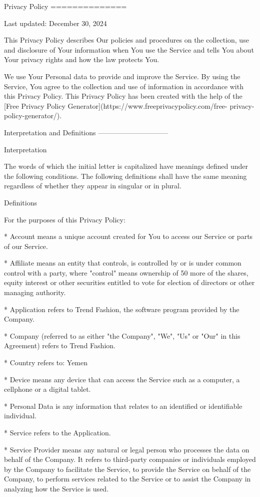 Privacy Policy  
==============

Last updated: December 30, 2024

This Privacy Policy describes Our policies and procedures on the collection,
use and disclosure of Your information when You use the Service and tells You
about Your privacy rights and how the law protects You.

We use Your Personal data to provide and improve the Service. By using the
Service, You agree to the collection and use of information in accordance with
this Privacy Policy. This Privacy Policy has been created with the help of the
[Free Privacy Policy Generator](https://www.freeprivacypolicy.com/free-
privacy-policy-generator/).

Interpretation and Definitions  
------------------------------

Interpretation  
~~~~~~~~~~~~~~

The words of which the initial letter is capitalized have meanings defined
under the following conditions. The following definitions shall have the same
meaning regardless of whether they appear in singular or in plural.

Definitions  
~~~~~~~~~~~

For the purposes of this Privacy Policy:

  * Account means a unique account created for You to access our Service or
    parts of our Service.

  * Affiliate means an entity that controls, is controlled by or is under
    common control with a party, where "control" means ownership of 50%
    more of the shares, equity interest or other securities entitled to vote
    for election of directors or other managing authority.

  * Application refers to Trend Fashion, the software program provided by the
    Company.

  * Company (referred to as either "the Company", "We", "Us" or "Our" in this
    Agreement) refers to Trend Fashion.

  * Country refers to: Yemen

  * Device means any device that can access the Service such as a computer, a
    cellphone or a digital tablet.

  * Personal Data is any information that relates to an identified or
    identifiable individual.

  * Service refers to the Application.

  * Service Provider means any natural or legal person who processes the data
    on behalf of the Company. It refers to third-party companies or
    individuals employed by the Company to facilitate the Service, to provide
    the Service on behalf of the Company, to perform services related to the
    Service or to assist the Company in analyzing how the Service is used.

